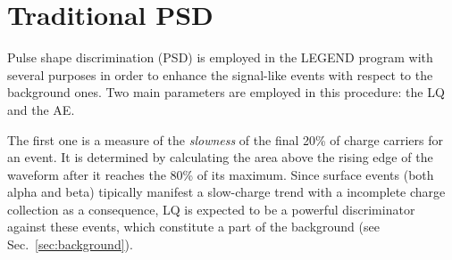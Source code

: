\section{Traditional \ac{PSD}}
\label{sec:traditionalPSD}
Pulse shape discrimination (\ac{PSD}) is employed in the LEGEND program with several purposes in order to enhance the signal-like events with respect to the background ones. Two main parameters are employed in this procedure: the \ac{LQ} and the \ac{AE}.

The first one is a measure of the \textit{slowness} of the final 20\% of charge carriers for an event. It is determined by calculating the area above the rising edge of the waveform after it reaches the 80\% of its maximum. Since surface events (both alpha and beta) tipically manifest a slow-charge trend with a incomplete charge collection as a consequence, \ac{LQ} is expected to be a powerful discriminator against these events, which constitute a part of the background (see Sec.~\ref{sec:background}). 

